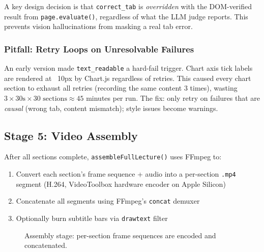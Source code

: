 \documentclass[12pt,a4paper]{article}
\begin{document}
A key design decision is that \texttt{correct\_tab} is \emph{overridden} with the
DOM-verified result from \texttt{page.evaluate()}, regardless of what the LLM
judge reports. This prevents vision hallucinations from masking a real tab error.

\subsubsection{Pitfall: Retry Loops on Unresolvable Failures}

An early version made \texttt{text\_readable} a hard-fail trigger. Chart axis tick
labels are rendered at ~10px by Chart.js regardless of retries. This caused every
chart section to exhaust all retries (recording the same content 3 times), wasting
$3 \times 30\text{s} \times 30\text{ sections} \approx 45$ minutes per run. The fix:
only retry on failures that are \emph{causal} (wrong tab, content mismatch); style
issues become warnings.

\subsection{Stage 5: Video Assembly}

After all sections complete, \texttt{assembleFullLecture()} uses FFmpeg to:

\begin{enumerate}[leftmargin=2em]
  \item Convert each section's frame sequence + audio into a per-section
        \texttt{.mp4} segment (H.264, VideoToolbox hardware encoder on Apple Silicon)
  \item Concatenate all segments using FFmpeg's \texttt{concat} demuxer
  \item Optionally burn subtitle bars via \texttt{drawtext} filter
\end{enumerate}

\begin{figure}[h]
\centering
{}
\caption{Assembly stage: per-section frame sequences are encoded and concatenated.}
\end{figure}
\end{document}
